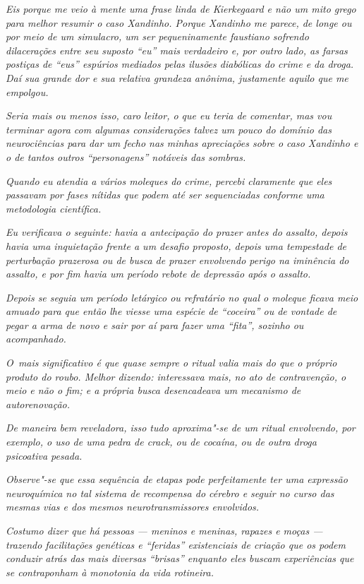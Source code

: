 \emph{Eis porque me veio à mente uma frase linda de Kierkegaard e não um
mito grego para melhor resumir o caso Xandinho. Porque Xandinho me
parece, de longe ou por meio de um simulacro, um ser pequeninamente
faustiano sofrendo dilacerações entre seu suposto ``eu'' mais verdadeiro
e, por outro lado, as farsas postiças de ``eus'' espúrios mediados pelas
ilusões diabólicas do crime e da droga. Daí sua grande dor e sua
relativa grandeza anônima, justamente aquilo que me empolgou.}

\emph{Seria mais ou menos isso, caro leitor, o que eu teria de comentar,
mas vou terminar agora com algumas considerações talvez um pouco do
domínio das neurociências para dar um fecho nas minhas apreciações sobre
o caso Xandinho e o de tantos outros ``personagens'' notáveis das
sombras.}

\emph{Quando eu atendia a vários moleques do crime, percebi claramente
que eles passavam por fases nítidas que podem até ser sequenciadas
conforme uma metodologia científica.}

\emph{Eu verificava o seguinte: havia a antecipação do prazer antes do
assalto, depois havia uma inquietação frente a um desafio proposto,
depois uma tempestade de perturbação prazerosa ou de busca de prazer
envolvendo perigo na iminência do assalto, e por fim havia um período
rebote de depressão após o assalto.}

\emph{Depois se seguia um período letárgico ou refratário no qual o
moleque ficava meio amuado para que então lhe viesse uma espécie de
``coceira'' ou de vontade de pegar a arma de novo e sair por aí para
fazer uma ``fita'', sozinho ou acompanhado.}

\emph{O~mais significativo é que quase sempre o ritual valia mais do que
o próprio produto do roubo. Melhor dizendo: interessava mais, no ato de
contravenção, o meio e não o fim; e a própria busca desencadeava um
mecanismo de autorenovação.}

\emph{De maneira bem reveladora, isso tudo aproxima"-se de um ritual
envolvendo, por exemplo, o uso de uma pedra de crack, ou de cocaína, ou
de outra droga psicoativa pesada.}

\emph{Observe"-se que essa sequência de etapas pode perfeitamente ter uma
expressão neuroquímica no tal sistema de recompensa do cérebro e seguir
no curso das mesmas vias e dos mesmos neurotransmissores envolvidos.}

\emph{Costumo dizer que há pessoas --- meninos e meninas, rapazes e
moças --- trazendo facilitações genéticas e ``feridas'' existenciais de
criação que os podem conduzir atrás das mais diversas ``brisas''
enquanto eles buscam experiências que se contraponham à monotonia da
vida rotineira.}

